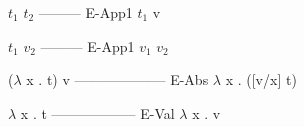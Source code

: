 \begin{minipage}{2in}
  \begin{AVerb}
    $t_1$ $t_2$
   --------- E-App1
    $t_1$ v

    $t_1$ $v_2$
   --------- E-App1
    $v_1$ $v_2$

   ($\lambda$ x . t) v
  -------------------- E-Abs
 $\lambda$ x . ([v/x] t)

   $\lambda$ x . t
  ------------------ E-Val
   $\lambda$ x . v
  \end{AVerb}
\end{minipage}

